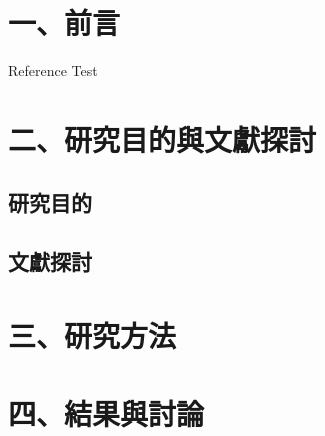 \documentclass[12pt, a4paper,]{article}
\begin{document}
\begin{spacing}{1}

\section{\bf \large 一、\bf \large 前言}
	Reference Test \cite{website:google}
\section{\bf \large 二、\bf \large 研究目的與文獻探討}
	\subsection{研究目的}
	\subsection{文獻探討}

\section{\bf \large 三、\bf \large 研究方法}


\section{\bf \large 四、\bf \large 結果與討論}

 


\end{spacing}
\end{document}
